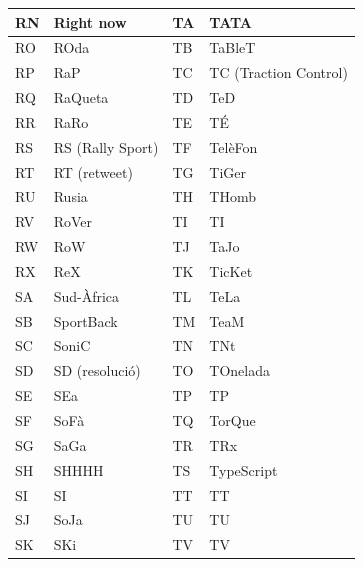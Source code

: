\begin{table}[ht]
    \centering
    \begin{tabular}{|l|l|l|l|}
        \hline
        RN & Right now              & TA & TATA                  \\ \hline
        RO & ROda                   & TB & TaBleT                \\ \hline
        RP & RaP                    & TC & TC (Traction Control) \\ \hline
        RQ & RaQueta                & TD & TeD                   \\ \hline
        RR & RaRo                   & TE & TÉ                    \\ \hline
        RS & RS (Rally Sport)       & TF & TelèFon               \\ \hline
        RT & RT (retweet)           & TG & TiGer                 \\ \hline
        RU & Rusia                  & TH & THomb                 \\ \hline
        RV & RoVer                  & TI & TI                    \\ \hline
        RW & RoW                    & TJ & TaJo                  \\ \hline
        RX & ReX                    & TK & TicKet                \\ \hline
        SA & Sud-Àfrica             & TL & TeLa                  \\ \hline
        SB & SportBack              & TM & TeaM                  \\ \hline
        SC & SoniC                  & TN & TNt                   \\ \hline
        SD & SD (resolució)         & TO & TOnelada              \\ \hline
        SE & SEa                    & TP & TP                    \\ \hline
        SF & SoFà                   & TQ & TorQue                \\ \hline
        SG & SaGa                   & TR & TRx                   \\ \hline
        SH & SHHHH                  & TS & TypeScript            \\ \hline
        SI & SI                     & TT & TT                    \\ \hline
        SJ & SoJa                   & TU & TU                    \\ \hline
        SK & SKi                    & TV & TV                    \\ \hline

\end{tabular}
\end{table}

